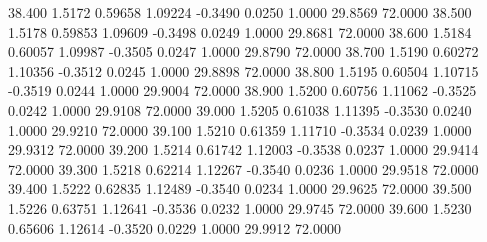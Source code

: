   38.400   1.5172   0.59658   1.09224  -0.3490   0.0250   1.0000  29.8569  72.0000
  38.500   1.5178   0.59853   1.09609  -0.3498   0.0249   1.0000  29.8681  72.0000
  38.600   1.5184   0.60057   1.09987  -0.3505   0.0247   1.0000  29.8790  72.0000
  38.700   1.5190   0.60272   1.10356  -0.3512   0.0245   1.0000  29.8898  72.0000
  38.800   1.5195   0.60504   1.10715  -0.3519   0.0244   1.0000  29.9004  72.0000
  38.900   1.5200   0.60756   1.11062  -0.3525   0.0242   1.0000  29.9108  72.0000
  39.000   1.5205   0.61038   1.11395  -0.3530   0.0240   1.0000  29.9210  72.0000
  39.100   1.5210   0.61359   1.11710  -0.3534   0.0239   1.0000  29.9312  72.0000
  39.200   1.5214   0.61742   1.12003  -0.3538   0.0237   1.0000  29.9414  72.0000
  39.300   1.5218   0.62214   1.12267  -0.3540   0.0236   1.0000  29.9518  72.0000
  39.400   1.5222   0.62835   1.12489  -0.3540   0.0234   1.0000  29.9625  72.0000
  39.500   1.5226   0.63751   1.12641  -0.3536   0.0232   1.0000  29.9745  72.0000
  39.600   1.5230   0.65606   1.12614  -0.3520   0.0229   1.0000  29.9912  72.0000
